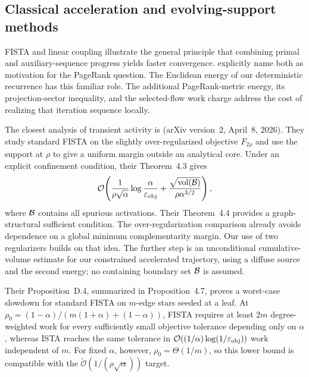 \subsection{Classical acceleration and evolving-support methods}

FISTA \citep{beck2009fast} and linear coupling
\citep{allenzhu2017linear} illustrate the general principle that combining
primal and auxiliary-sequence progress yields faster convergence.
\citet[Section~3]{fountoulakis2022open} explicitly name both as motivation
for the PageRank question. The Euclidean energy of our deterministic
recurrence has this familiar role. The additional PageRank-metric energy,
its projection-sector inequality, and the selected-flow work charge address
the cost of realizing that iteration sequence locally.

The closest analysis of transient activity is
\citet{fountoulakis2026complexity} (arXiv version~2, April~8, 2026). They study standard FISTA on the
slightly over-regularized objective $F_{2\rho}$ and use the support at
$\rho$ to give a uniform margin outside an analytical core. Under an
explicit confinement condition, their Theorem~4.3 gives
\begin{equation*}
 \mathcal{O}\!\left(\frac1{\rho\sqrt\alpha}\log\frac\alpha{\varepsilon_{\mathrm{obj}}}
       +\frac{\sqrt{\operatorname{vol}(\mathcal{B})}}{\rho\alpha^{3/2}}\right),
\end{equation*}
where $\mathcal{B}$ contains all spurious activations. Their Theorem~4.4 provides
a graph-structural sufficient condition.
The over-regularization comparison already avoids dependence on a global
minimum complementarity margin. Our use of two regularizers builds on that
idea. The further step is an unconditional cumulative-volume estimate for
our constrained accelerated trajectory, using a diffuse source and the
second energy; no containing boundary set $\mathcal{B}$ is assumed.

Their Proposition~D.4, summarized in Proposition~4.7, proves a worst-case
slowdown for standard FISTA on $m$-edge stars seeded at a leaf. At
$\rho_0=(1-\alpha)/(m(1+\alpha)+(1-\alpha))$, FISTA requires at least $2m$
degree-weighted work for every sufficiently small objective tolerance
depending only on $\alpha$, whereas ISTA reaches the same tolerance in
$\mathcal{O}((1/\alpha)\log(1/\varepsilon_{\mathrm{obj}}))$ work independent of $m$.
For fixed $\alpha$, however, $\rho_0=\Theta(1/m)$, so this lower bound is
compatible with the $\widetilde{\mathcal{O}}(1/(\rho\sqrt\alpha))$ target.

